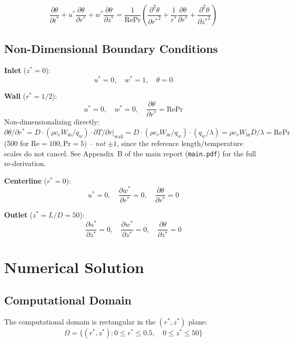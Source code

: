 \documentclass[12pt,a4paper]{article}
\newcommand{\parder}[2]{\frac{\partial #1}{\partial #2}}
\newcommand{\pparder}[2]{\frac{\partial^2 #1}{\partial {#2}^2}}
\newcommand{\Rey}{\text{Re}}
\newcommand{\Pran}{\text{Pr}}
\begin{document}
\begin{equation}
    \parder{\theta}{t^*} + u^*\parder{\theta}{r^*} + w^*\parder{\theta}{z^*} = \frac{1}{\Rey\Pran}\left(\pparder{\theta}{r^*} + \frac{1}{r^*}\parder{\theta}{r^*} + \pparder{\theta}{z^*}\right)
    \label{eq:energy_nondim}
\end{equation}

\subsection{Non-Dimensional Boundary Conditions}

\textbf{Inlet} ($z^* = 0$):
\begin{equation}
    u^* = 0, \quad w^* = 1, \quad \theta = 0
\end{equation}

\textbf{Wall} ($r^* = 1/2$):
\begin{equation}
    u^* = 0, \quad w^* = 0, \quad \parder{\theta}{r^*} = \Rey\Pran
\end{equation}
Non-dimensionalizing directly: $\partial\theta/\partial r^* = D\cdot(\rho c_v W_{\text{in}}/q_w)\cdot\partial T/\partial r|_{\text{wall}} = D\cdot(\rho c_v W_{\text{in}}/q_w)\cdot(q_w/\lambda) = \rho c_v W_{\text{in}} D/\lambda = \Rey\Pran$
(500 for $\Rey=100,\Pran=5$) -- \emph{not} $\pm1$, since the reference length/temperature
scales do not cancel. See Appendix~B of the main report (\texttt{main.pdf}) for the full
re-derivation.

\textbf{Centerline} ($r^* = 0$):
\begin{equation}
    u^* = 0, \quad \parder{w^*}{r^*} = 0, \quad \parder{\theta}{r^*} = 0
\end{equation}

\textbf{Outlet} ($z^* = L/D = 50$):
\begin{equation}
    \parder{u^*}{z^*} = 0, \quad \parder{w^*}{z^*} = 0, \quad \parder{\theta}{z^*} = 0
\end{equation}

\newpage

\section{Numerical Solution}

\subsection{Computational Domain}

The computational domain is rectangular in the $(r^*, z^*)$ plane:
\begin{equation}
    \Omega = \{(r^*, z^*) : 0 \leq r^* \leq 0.5, \quad 0 \leq z^* \leq 50\}
\end{equation}
\end{document}

